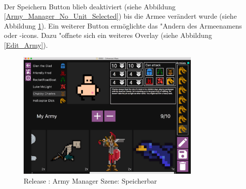 \documentclass[12pt, titlepage]{scrartcl}
\newcommand{\RN}[1]{%
	\textup{\uppercase\expandafter{\romannumeral#1}}%
}
\begin{document}
                \ \\ Der Speichern Button blieb deaktiviert (siehe Abbildung \ref{Army_Manager_No_Unit_Selected}) bis die Armee ver\"andert wurde (siehe Abbildung \ref{Army_Manager_Ready_To_Save}). Ein weiterer Button erm\"oglichte das "Andern des Armeenamens oder -icons. Dazu "offnete sich ein weiteres Overlay (siehe Abbildung \ref{Edit_Army}). \\
                \begin{figure}[H] 
    				\centering
    				\includegraphics[width=0.8\textwidth]{images/old_state/army_manager/ArmyReadyToSave.png}
    				\caption{Release \RN{2}: Army Manager Szene: Speicherbar}
    				\label{Army_Manager_Ready_To_Save}
			    \end{figure}
\end{document}
